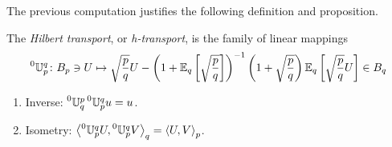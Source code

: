 \documentclass[12pt,a4paper]{amsart}
\begin{document}
The previous computation justifies the following definition and proposition.

\begin{definition}
The \emph{Hilbert transport}, or \emph{h-transport}, is the family of linear mappings
%
    \begin{equation*}
  \htransport p q \colon B_p \ni U \mapsto \sqrt{\frac pq} U  -  \left(1 +  \expectat q {\sqrt{\frac pq}}\right)^{-1} \left(1 + \sqrt{\frac pq}\right) \expectat q {\sqrt{\frac pq}U} \in B_q
    \end{equation*}
\end{definition}

\begin{proposition}
  \begin{enumerate}
  \item Inverse: $\htransport q p \htransport p q u = u$.
  \item Isometry: $\scalarat q {\htransport p q U}{\htransport p q V} = \scalarat p U V$.
  \end{enumerate}
  \end{proposition}
%
\end{document}
